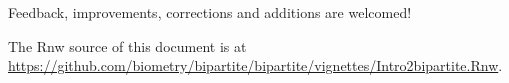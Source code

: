 \documentclass[a4paper, 11pt]{article}\usepackage[]{graphicx}\usepackage[]{color}
\begin{document}
\medskip
\noindent Feedback, improvements, corrections and additions are welcomed!







\bigskip

The Rnw source of this document is at \url{https://github.com/biometry/bipartite/bipartite/vignettes/Intro2bipartite.Rnw}.

\setlength{\bibsep}{0cm}
\def\bibfont{\small}


\printindex
\end{document}
